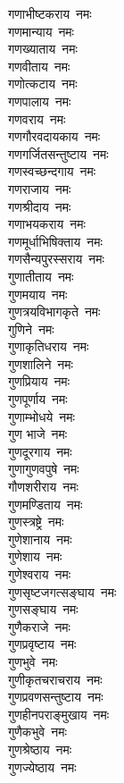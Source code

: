 \begin{multicols}{2}
\begin{flushleft}
गणाभीष्टकराय~नमः\\
गणमान्याय~नमः\\
गणख्याताय~नमः\\
गणवीताय~नमः\hfill{}\\
गणोत्कटाय~नमः\\
गणपालाय~नमः\\
गणवराय~नमः\\
गणगौरवदायकाय~नमः\\
गणगर्जितसन्तुष्टाय~नमः\\
गणस्वच्छन्दगाय~नमः\\
गणराजाय~नमः\\
गणश्रीदाय~नमः\\
गणाभयकराय~नमः\\
गणमूर्धाभिषिक्ताय~नमः\hfill{}\\
गणसैन्यपुरस्सराय~नमः\\
गुणातीताय~नमः\\
गुणमयाय~नमः\\
गुणत्रयविभागकृते~नमः\\
गुणिने~नमः\\
गुणाकृतिधराय~नमः\\
गुणशालिने~नमः\\
गुणप्रियाय~नमः\\
गुणपूर्णाय~नमः\\
गुणाम्भोधये~नमः\hfill{}\\
गुण भाजे~नमः\\
गुणदूरगाय~नमः\\
गुणागुणवपुषे~नमः\\
गौणशरीराय~नमः\\
गुणमण्डिताय~नमः\\
गुणस्त्रष्ट्रे~नमः\\
गुणेशानाय~नमः\\
गुणेशाय~नमः\\
गुणेश्वराय~नमः\\
गुणसृष्टजगत्सङ्घाय~नमः\hfill{}\\
गुणसङ्घाय~नमः\\
गुणैकराजे~नमः\\
गुणप्रवृष्टाय~नमः\\
गुणभुवे~नमः\\
गुणीकृतचराचराय~नमः\\
गुणप्रवणसन्तुष्टाय~नमः\\
गुणहीनपराङ्मुखाय~नमः\\
गुणैकभुवे~नमः\\
गुणश्रेष्ठाय~नमः\\
गुणज्येष्ठाय~नमः\hfill{}\\

\end{flushleft}
\end{multicols}
